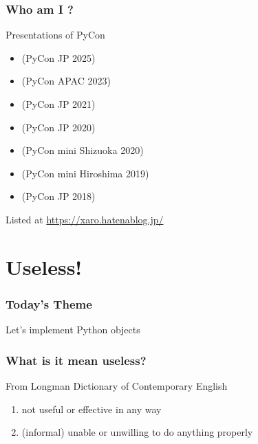 \documentclass[aspectratio=169,dvipdfmx,12pt,notheorems]{beamer}
\theoremstyle{definition}
\begin{document}
\begin{frame}\frametitle{Who am I ?}

\begin{block}{Presentations of PyCon}
\begin{itemize}
\item {}(PyCon JP 2025)
\item {}(PyCon APAC 2023)
\item {}(PyCon JP 2021)
\item {}(PyCon JP 2020)
\item {}(PyCon mini Shizuoka 2020)
\item {}(PyCon mini Hiroshima 2019)
\item {}(PyCon JP 2018)
\end{itemize}
\end{block}
Listed at  \url{https://xaro.hatenablog.jp/}

\end{frame}

\section{Useless!}

\begin{frame}\frametitle{Today's Theme}

\begin{center}
\LARGE{Let's implement  Python objects}
\end{center}
\end{frame}

\begin{frame}\frametitle{What is it mean useless?}

\begin{block}{From  Longman Dictionary of Contemporary English}
\begin{enumerate}
\item not useful or effective in any way
\item (informal) unable or unwilling to do anything properly
\end{enumerate}
\end{block}
\end{frame}
\end{document}
